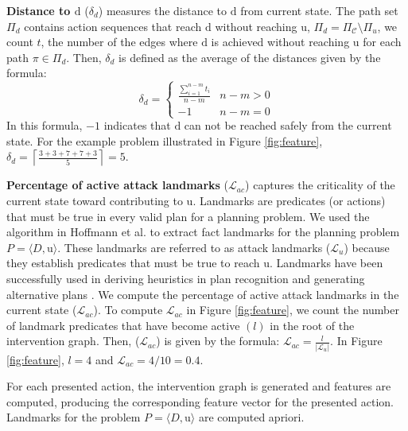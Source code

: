 \documentclass[letterpaper]{article}
\theoremstyle{plain}
\begin{document}
\textbf{Distance to $\boldsymbol{\mathrm{d}}$} ($\delta_d$) measures the distance to $\mathrm{d}$ from current state. The path set $\Pi_{d}$ contains action sequences that reach $\mathrm{d}$ without reaching $\mathrm{u}$, $\Pi_{d} = \Pi_{\mathcal{C}} \setminus \Pi_{u} $, we count  $t$, the number of the edges where $\mathrm{d}$ is achieved without reaching $\mathrm{u}$ for each path $\pi \in \Pi_{d}$. Then, $\delta_d$ is defined as the average of the distances given by the formula:
\begin{equation*} 
\delta_d = \left\{\begin{matrix}
\frac{\sum_{i=1}^{n-m}t_i}{n-m} & n-m>0\\ 
-1 &  n-m=0
\end{matrix}\right.
\end{equation*}
In this formula, $-1$ indicates that $\mathrm{d}$ can not be reached safely from the current state. For the example problem illustrated in Figure \ref{fig:feature}, $\delta_d=\left \lceil \frac{3+3+7+7+3}{5} \right \rceil=5$.


\textbf{Percentage of active attack landmarks} ($\mathcal{L}_{ac}$) captures the criticality of the current state toward contributing to $\mathrm{u}$. 
Landmarks \cite{hoffman2004lm} are predicates (or actions) that must be true in every valid plan for a planning problem. We used the algorithm in Hoffmann et al.  to extract fact landmarks for the planning problem $P = \langle D, \mathrm{u}\rangle$. These landmarks are referred to as attack landmarks ($\mathcal{L}_{u}$) because they establish predicates that must be true to reach $\mathrm{u}$.  Landmarks have been successfully used in deriving heuristics in plan recognition \cite{vered2018goalrec} and generating alternative plans \cite{bryce2014diverse}. We compute the percentage of active attack landmarks in the current state ($\mathcal{L}_{ac}$). To compute $\mathcal{L}_{ac}$ in Figure \ref{fig:feature}, we count the number of landmark predicates that have become active $(l)$ in the root of the intervention graph. Then, ($\mathcal{L}_{ac}$) is given by the formula: $\mathcal{L}_{ac} = \frac{l}{\left |\mathcal{L}_{u}\right|}$. In Figure \ref{fig:feature}, $l=4$ and $\mathcal{L}_{ac}=4/10=0.4$.

For each presented action, the intervention graph is generated and features are computed, producing the corresponding feature vector for the presented action. Landmarks for the problem $P = \langle D, \mathrm{u}\rangle$ are computed apriori. 
\end{document}
